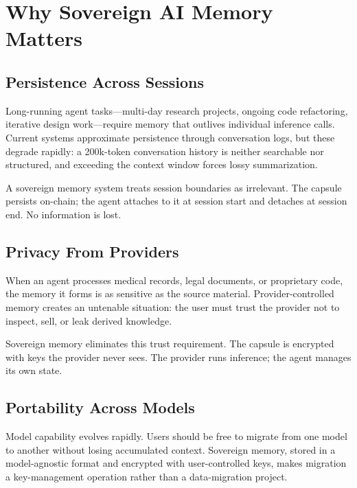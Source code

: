 \documentclass[11pt,letterpaper]{article}
\theoremstyle{definition}
\theoremstyle{remark}
\begin{document}
\section{Why Sovereign AI Memory Matters}
\label{sec:why}

\subsection{Persistence Across Sessions}

Long-running agent tasks---multi-day research projects, ongoing code refactoring, iterative design work---require memory that outlives individual inference calls. Current systems approximate persistence through conversation logs, but these degrade rapidly: a 200k-token conversation history is neither searchable nor structured, and exceeding the context window forces lossy summarization.

A sovereign memory system treats session boundaries as irrelevant. The capsule persists on-chain; the agent attaches to it at session start and detaches at session end. No information is lost.

\subsection{Privacy From Providers}

When an agent processes medical records, legal documents, or proprietary code, the memory it forms is as sensitive as the source material. Provider-controlled memory creates an untenable situation: the user must trust the provider not to inspect, sell, or leak derived knowledge.

Sovereign memory eliminates this trust requirement. The capsule is encrypted with keys the provider never sees. The provider runs inference; the agent manages its own state.

\subsection{Portability Across Models}

Model capability evolves rapidly. Users should be free to migrate from one model to another without losing accumulated context. Sovereign memory, stored in a model-agnostic format and encrypted with user-controlled keys, makes migration a key-management operation rather than a data-migration project.
\end{document}
